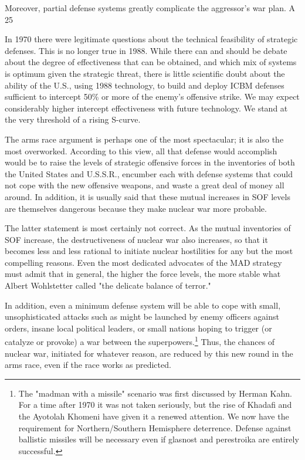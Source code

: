 Moreover, partial defense systems greatly complicate the aggressor's war plan. A 25%

In 1970 there were legitimate questions about the technical feasibility of strategic defenses. This is no longer true in 1988. While there can and should be debate about the degree of effectiveness that can be obtained, and which mix of systems is optimum given the strategic threat, there is little scientific doubt about the ability of the U.S., using 1988 technology, to build and deploy ICBM defenses sufficient to intercept 50\% or more of the enemy's offensive strike. We may expect considerably higher intercept effectiveness with future technology. We stand at the very threshold of a rising S-curve.

The arms race argument is perhaps one of the most spectacular; it is also the most overworked. According to this view, all that defense would accomplish would be to raise the levels of strategic offensive forces in the inventories of both the United States and U.S.S.R., encumber each with defense systems that could not cope with the new offensive weapons, and waste a great deal of money all around. In addition, it is usually said that these mutual increases in SOF levels are themselves dangerous because they make nuclear war more probable.

The latter statement is most certainly not correct. As the mutual inventories of SOF increase, the destructiveness of nuclear war also increases, so that it becomes less and less rational to initiate nuclear hostilities for any but the most compelling reasons. Even the most dedicated advocates of the MAD strategy must admit that in general, the higher the force levels, the more stable what Albert Wohlstetter called "the delicate balance of terror."

In addition, even a minimum defense system will be able to cope with small, unsophisticated attacks such as might be launched by enemy officers against orders, insane local political leaders, or small nations hoping to trigger (or catalyze or provoke) a war between the superpowers.\footnote{
The "madman with a missile" scenario was first discussed by Herman Kahn. For a time after 1970 it was not taken seriously, but the rise of Khadafi and the Ayotolah Khomeni have given it a renewed attention. We now have the requirement for Northern/Southern Hemisphere deterrence. Defense against ballistic missiles will be necessary even if glasnost and perestroika are entirely successful.
}
Thus, the chances of nuclear war, initiated for whatever reason, are reduced by this new round in the arms race, even if the race works as predicted.

